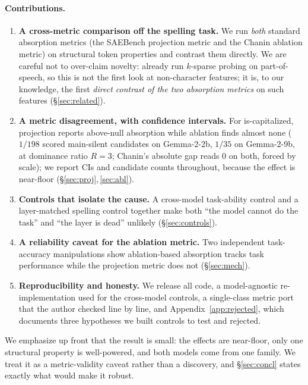 \documentclass[11pt]{article}
\newcommand{\iscap}{\textsf{is-capitalized}}
\theoremstyle{definition}
\begin{document}
\paragraph{Contributions.}
\begin{enumerate}[leftmargin=1.4em,itemsep=2pt]
  \item \textbf{A cross-metric comparison off the spelling task.} We run \emph{both} standard absorption
  metrics (the SAEBench projection metric and the Chanin ablation metric) on structural token properties
  and contrast them directly. We are careful not to over-claim novelty: \citet{chanin2025hedging} already
  run $k$-sparse probing on part-of-speech, so this is not the first look at non-character features; it is,
  to our knowledge, the first \emph{direct contrast of the two absorption metrics} on such features
  (\S\ref{sec:related}).
  \item \textbf{A metric disagreement, with confidence intervals.} For \iscap{}, projection reports
  above-null absorption while ablation finds almost none ($1/198$ scored main-silent candidates on
  Gemma-2-2b, $1/35$ on Gemma-2-9b, at dominance ratio $R{=}3$; Chanin's absolute gap reads $0$ on both,
  forced by scale); we report CIs and candidate counts throughout,
  because the effect is near-floor (\S\ref{sec:proj},\,\ref{sec:abl}).
  \item \textbf{Controls that isolate the cause.} A cross-model task-ability control and a layer-matched
  spelling control together make both ``the model cannot do the task'' and ``the layer
  is dead'' unlikely (\S\ref{sec:controls}).
  \item \textbf{A reliability caveat for the ablation metric.} Two independent task-accuracy manipulations
  show ablation-based absorption tracks task performance while the projection metric does not
  (\S\ref{sec:mech}).
  \item \textbf{Reproducibility and honesty.} We release all code, a model-agnostic re-implementation used
  for the cross-model controls, a single-class metric port that the author checked line by line, and
  Appendix~\ref{app:rejected}, which documents three hypotheses we built controls to test and rejected.
\end{enumerate}

We emphasize up front that the result is small: the effects are near-floor, only one structural property is
well-powered, and both models come from one family. We treat it as a metric-validity caveat rather than a
discovery, and \S\ref{sec:concl} states exactly what would make it robust.
\end{document}
